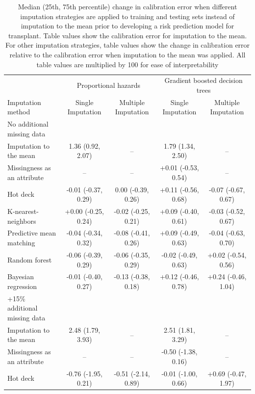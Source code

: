 \documentclass{article}
\begin{document}
\begin{table} 
 \caption{Median (25th, 75th percentile) change in calibration error when different imputation strategies are applied to training and testing sets instead of imputation to the mean prior to developing a risk prediction model for transplant. Table values show the calibration error for imputation to the mean. For other imputation strategies, table values show the change in calibration error relative to the calibration error when imputation to the mean was applied. All table values are multiplied by 100 for ease of interpretability} 
\label{tbl_md_strat_txpl_cal_error} 
 
\begin{tabular}{lcccc}
\toprule
& \multicolumn{2}{c}{Proportional hazards} & \multicolumn{2}{c}{Gradient boosted decision trees} \\ 
 \cmidrule(lr){2-3}\cmidrule(lr){4-5}
Imputation method & Single Imputation & Multiple Imputation & Single Imputation & Multiple Imputation \\ 
\midrule
\multicolumn{1}{l}{No additional missing data} \\ 
\midrule
Imputation to the mean & 1.36 (0.92, 2.07) & -- & 1.79 (1.34, 2.50) & -- \\ 
Missingness as an attribute & -- & -- & +0.01 (-0.53, 0.54) & -- \\ 
Hot deck & -0.01 (-0.37, 0.29) & 0.00 (-0.39, 0.26) & +0.11 (-0.56, 0.68) & -0.07 (-0.67, 0.67) \\ 
K-nearest-neighbors & +0.00 (-0.25, 0.24) & -0.02 (-0.25, 0.21) & +0.09 (-0.40, 0.61) & -0.03 (-0.52, 0.67) \\ 
Predictive mean matching & -0.04 (-0.34, 0.32) & -0.08 (-0.41, 0.26) & +0.09 (-0.49, 0.63) & -0.04 (-0.63, 0.70) \\ 
Random forest & -0.06 (-0.39, 0.29) & -0.06 (-0.35, 0.29) & -0.02 (-0.49, 0.63) & +0.02 (-0.54, 0.56) \\ 
Bayesian regression & -0.01 (-0.40, 0.27) & -0.13 (-0.38, 0.18) & +0.12 (-0.46, 0.78) & +0.24 (-0.46, 1.04) \\ 
\midrule
\multicolumn{1}{l}{+15\% additional missing data} \\ 
\midrule
Imputation to the mean & 2.48 (1.79, 3.93) & -- & 2.51 (1.81, 3.29) & -- \\ 
Missingness as an attribute & -- & -- & -0.50 (-1.38, 0.16) & -- \\ 
Hot deck & -0.76 (-1.95, 0.21) & -0.51 (-2.14, 0.89) & -0.01 (-1.00, 0.66) & +0.69 (-0.47, 1.97) \\ 

\end{tabular}
\end{table}
\end{document}
